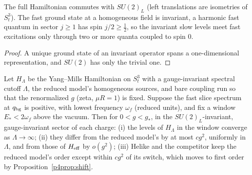 \begin{lemma}\label{p4lem:sel}
 The full Hamiltonian commutes with $SU(2)_L$ (left translations are isometries of $S^3_t$). The fast
ground state at a homogeneous field is invariant, a harmonic fast quantum in sector $j\geq1$ has spin $j/2\geq\tfrac12$, so the
invariant slow levels meet fast excitations only through two or more quanta coupled to spin $0$.
\end{lemma}
\begin{proof}
A unique ground state of an invariant operator spans a one-dimensional representation, and $SU(2)$ has only the trivial one.
\end{proof}

\begin{conjecture}\label{p4conj:m3}
 Let $H_\Lambda$ be the Yang--Mills Hamiltonian on $S^3_t$ with a gauge-invariant spectral cutoff
$\Lambda$, the reduced model's homogeneous sources, and bare coupling run so that the renormalized $g$ (zeta, $\mu R=1$) is
fixed. Suppose the fast slice spectrum at $q_{\rm bg}$ is positive, with lowest frequency $\omega_f$ (reduced units), and fix a
window $E_*<2\omega_f$ above the vacuum. Then for $0<g<g_*$, in the $SU(2)_L$-invariant, gauge-invariant sector of each
charge: (i) the levels of $H_\Lambda$ in the window converge as $\Lambda\to\infty$; (ii) they differ from the reduced model's
by at most $cg^2$, uniformly in $\Lambda$, and from those of $H_{\rm eff}$ by $o(g^2)$; (iii) Helike and the competitor keep the
reduced model's order except within $cg^2$ of its switch, which moves to first order by Proposition~\ref{p4prop:shift}.
\end{conjecture}

